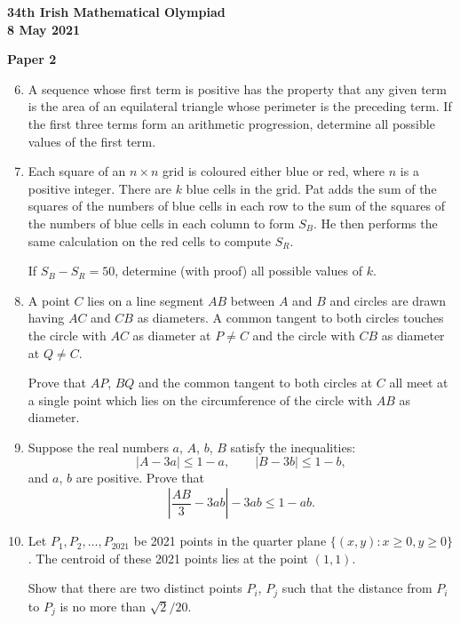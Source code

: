 \documentclass[12pt]{article}
\begin{document}
\newpage
\begin{center}
{\large\bfseries 34th Irish Mathematical Olympiad\\8 May 2021}
\end{center}
\bigskip\noindent\textbf{Paper 2}\bigskip
\begin{enumerate}
\setcounter{enumi}{5}
\item A sequence whose first term is positive has the property that any given term is the area of an equilateral triangle whose perimeter is the preceding term. If the first three terms form an arithmetic progression, determine all possible values of the first term.

\item Each square of an $n \times n$ grid is coloured either blue or red, where $n$ is a positive integer. There are $k$ blue cells in the grid. Pat adds the sum of the squares of the numbers of blue cells in each row to the sum of the squares of the numbers of blue cells in each column to form $S_B$. He then performs the same calculation on the red cells to compute $S_R$.

If $S_B - S_R = 50$, determine (with proof) all possible values of $k$.

\item A point $C$ lies on a line segment $AB$ between $A$ and $B$ and circles are drawn having $AC$ and $CB$ as diameters. A common tangent to both circles touches the circle with $AC$ as diameter at $P \ne C$ and the circle with $CB$ as diameter at $Q \ne C$.

Prove that $AP$, $BQ$ and the common tangent to both circles at $C$ all meet at a single point which lies on the circumference of the circle with $AB$ as diameter.

\item Suppose the real numbers $a$, $A$, $b$, $B$ satisfy the inequalities:
\[
|A - 3a| \le 1 - a, \qquad |B - 3b| \le 1 - b,
\]
and $a$, $b$ are positive. Prove that
\[
\left|\frac{AB}{3} - 3ab\right| - 3ab \le 1 - ab.
\]

\item Let $P_1, P_2, \ldots, P_{2021}$ be 2021 points in the quarter plane $\{(x,y) : x \ge 0, y \ge 0\}$. The centroid of these 2021 points lies at the point $(1, 1)$.

Show that there are two distinct points $P_i$, $P_j$ such that the distance from $P_i$ to $P_j$ is no more than $\sqrt{2}/20$.
\end{enumerate}
\end{document}
